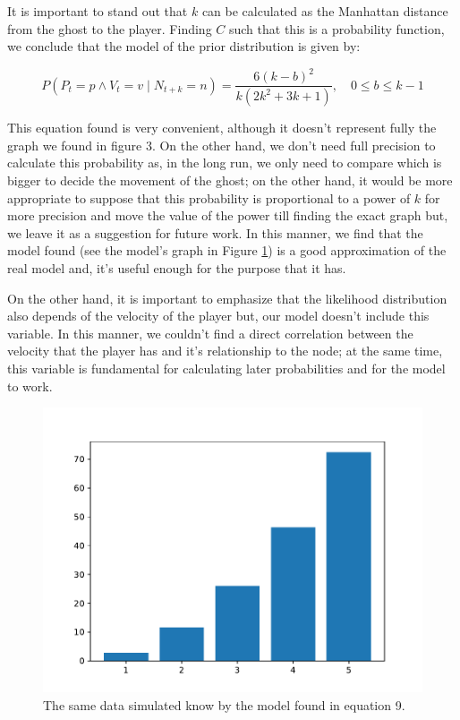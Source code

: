It is important to stand out that $k$ can be calculated as the Manhattan distance from the ghost to the player. Finding $C$ such that this is a probability function, we conclude that the model of the prior distribution is given by:

\begin{equation}
	P({ P }_{ t }=p\wedge { V }_{ t}=v\mid{ N }_{ t+k }=n) = \frac{6(k-b)^2}{k(2k^2 + 3k +1)}, \quad 0 \le b \le k-1
\end{equation}

This equation found is very convenient, although it doesn't represent fully the graph we found in figure 3. On the other hand, we don't need full precision to calculate this probability as, in the long run, we only need to compare which is bigger to decide the movement of the ghost; on the other hand, it would be more appropriate to suppose that this probability is proportional to a power of $k$ for more precision and move the value of the power till finding the exact graph but, we leave it as a suggestion for future work. In this manner, we find that the model found (see the model's graph in Figure \ref{img:real}) is a good approximation of the real model and, it's useful enough for the purpose that it has. 

On the other hand, it is important to emphasize that the likelihood distribution also depends of the velocity of the player but, our model doesn't include this variable. In this manner, we couldn't find a direct correlation between the velocity that the player has and it's relationship to the node; at the same time, this variable is fundamental for calculating later probabilities and for the model to work. 
	\begin{figure}[H]
          \centering
          \includegraphics[scale=0.5]{files/Modelo_Teorico.pdf}
          \caption{The same data simulated know by the model found in equation 9.}
          \label{img:real}
      \end{figure}
      
